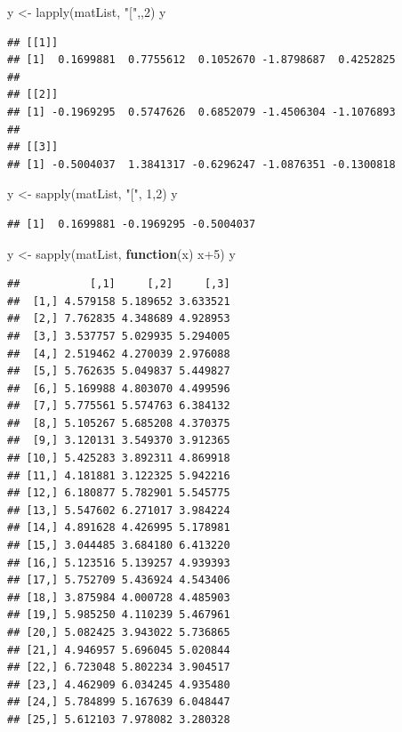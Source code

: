 \documentclass[]{article}
\newenvironment{Shaded}{\begin{snugshade}}{\end{snugshade}}
\newcommand{\ControlFlowTok}[1]{\textcolor[rgb]{0.13,0.29,0.53}{\textbf{#1}}}
\newcommand{\DecValTok}[1]{\textcolor[rgb]{0.00,0.00,0.81}{#1}}
\newcommand{\FunctionTok}[1]{\textcolor[rgb]{0.00,0.00,0.00}{#1}}
\newcommand{\NormalTok}[1]{#1}
\newcommand{\OtherTok}[1]{\textcolor[rgb]{0.56,0.35,0.01}{#1}}
\newcommand{\SpecialCharTok}[1]{\textcolor[rgb]{0.00,0.00,0.00}{#1}}
\newcommand{\StringTok}[1]{\textcolor[rgb]{0.31,0.60,0.02}{#1}}
\begin{document}
\begin{Shaded}
\begin{Highlighting}[]
\NormalTok{y }\OtherTok{\textless{}{-}} \FunctionTok{lapply}\NormalTok{(matList, }\StringTok{"["}\NormalTok{,,}\DecValTok{2}\NormalTok{)}
\NormalTok{y}
\end{Highlighting}
\end{Shaded}

\begin{verbatim}
## [[1]]
## [1]  0.1699881  0.7755612  0.1052670 -1.8798687  0.4252825
## 
## [[2]]
## [1] -0.1969295  0.5747626  0.6852079 -1.4506304 -1.1076893
## 
## [[3]]
## [1] -0.5004037  1.3841317 -0.6296247 -1.0876351 -0.1300818
\end{verbatim}

\begin{Shaded}
\begin{Highlighting}[]
\NormalTok{y }\OtherTok{\textless{}{-}} \FunctionTok{sapply}\NormalTok{(matList, }\StringTok{"["}\NormalTok{, }\DecValTok{1}\NormalTok{,}\DecValTok{2}\NormalTok{)}
\NormalTok{y}
\end{Highlighting}
\end{Shaded}

\begin{verbatim}
## [1]  0.1699881 -0.1969295 -0.5004037
\end{verbatim}

\begin{Shaded}
\begin{Highlighting}[]
\NormalTok{y }\OtherTok{\textless{}{-}} \FunctionTok{sapply}\NormalTok{(matList, }\ControlFlowTok{function}\NormalTok{(x) x}\SpecialCharTok{+}\DecValTok{5}\NormalTok{)}
\NormalTok{y}
\end{Highlighting}
\end{Shaded}

\begin{verbatim}
##           [,1]     [,2]     [,3]
##  [1,] 4.579158 5.189652 3.633521
##  [2,] 7.762835 4.348689 4.928953
##  [3,] 3.537757 5.029935 5.294005
##  [4,] 2.519462 4.270039 2.976088
##  [5,] 5.762635 5.049837 5.449827
##  [6,] 5.169988 4.803070 4.499596
##  [7,] 5.775561 5.574763 6.384132
##  [8,] 5.105267 5.685208 4.370375
##  [9,] 3.120131 3.549370 3.912365
## [10,] 5.425283 3.892311 4.869918
## [11,] 4.181881 3.122325 5.942216
## [12,] 6.180877 5.782901 5.545775
## [13,] 5.547602 6.271017 3.984224
## [14,] 4.891628 4.426995 5.178981
## [15,] 3.044485 3.684180 6.413220
## [16,] 5.123516 5.139257 4.939393
## [17,] 5.752709 5.436924 4.543406
## [18,] 3.875984 4.000728 4.485903
## [19,] 5.985250 4.110239 5.467961
## [20,] 5.082425 3.943022 5.736865
## [21,] 4.946957 5.696045 5.020844
## [22,] 6.723048 5.802234 3.904517
## [23,] 4.462909 6.034245 4.935480
## [24,] 5.784899 5.167639 6.048447
## [25,] 5.612103 7.978082 3.280328
\end{verbatim}
\end{document}
